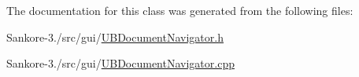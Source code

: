 The documentation for this class was generated from the following files\-:\begin{DoxyCompactItemize}
\item 
Sankore-\/3./src/gui/\hyperlink{_u_b_document_navigator_8h}{U\-B\-Document\-Navigator.\-h}\item 
Sankore-\/3./src/gui/\hyperlink{_u_b_document_navigator_8cpp}{U\-B\-Document\-Navigator.\-cpp}\end{DoxyCompactItemize}
